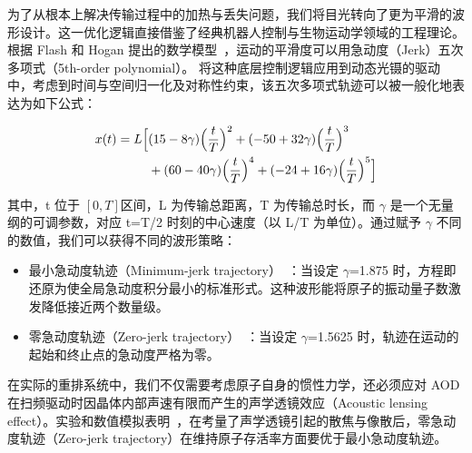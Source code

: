 \documentclass[../main.tex]{subfiles}
\begin{document}
为了从根本上解决传输过程中的加热与丢失问题，我们将目光转向了更为平滑的波形设计。这一优化逻辑直接借鉴了经典机器人控制与生物运动学领域的工程理论。根据 Flash 和 Hogan 提出的数学模型~\cite{flash1985coordination}，运动的平滑度可以用急动度（Jerk）五次多项式（5th-order polynomial）。
将这种底层控制逻辑应用到动态光镊的驱动中，考虑到时间与空间归一化及对称性约束，该五次多项式轨迹可以被一般化地表达为如下公式： 

\begin{equation}
\begin{split}
x(t)=L\Bigl[&(15-8\gamma)\Bigl(\frac{t}{T}\Bigr)^2
             +(-50+32\gamma)\Bigl(\frac{t}{T}\Bigr)^3\\
            &+(60-40\gamma)\Bigl(\frac{t}{T}\Bigr)^4
             +(-24+16\gamma)\Bigl(\frac{t}{T}\Bigr)^5\Bigr]
\end{split}
\end{equation}


其中，t 位于 $[0,T]$区间，L 为传输总距离，T 为传输总时长，而 $\gamma$ 是一个无量纲的可调参数，对应 t=T/2 时刻的中心速度（以 L/T 为单位）。通过赋予 $\gamma$ 不同的数值，我们可以获得不同的波形策略：
\begin{itemize}
    \item 最小急动度轨迹（Minimum-jerk trajectory）~\cite{chinnarasu2025variational}：当设定 $\gamma$=1.875 时，方程即还原为使全局急动度积分最小的标准形式。这种波形能将原子的振动量子数激发降低接近两个数量级。
    \item 零急动度轨迹（Zero-jerk trajectory）~\cite{zhang2025leveraging}：当设定 $\gamma$=1.5625 时，轨迹在运动的起始和终止点的急动度严格为零。
\end{itemize}

在实际的重排系统中，我们不仅需要考虑原子自身的惯性力学，还必须应对 AOD 在扫频驱动时因晶体内部声速有限而产生的声学透镜效应（Acoustic lensing effect）。实验和数值模拟表明~\cite{zhang2025leveraging}，在考量了声学透镜引起的散焦与像散后，零急动度轨迹（Zero-jerk trajectory）在维持原子存活率方面要优于最小急动度轨迹。

\end{document}
